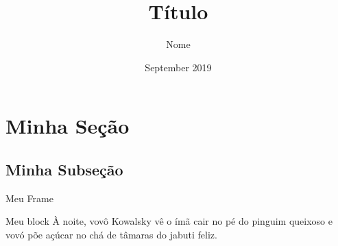 \documentclass{beamer}
\title{Título}
\author{Nome}
\date{September 2019}
\begin{document}
^^I^^I
\maketitle
^^I^^I
\section{Minha Seção}
^^I^^I
\subsection{Minha Subseção}
^^I^^I
\begin{frame}{Meu Frame}

    \begin{block}{Meu block}
        À noite, vovô Kowalsky vê o ímã cair no pé do pinguim queixoso e vovó põe açúcar no chá de tâmaras do jabuti feliz.
    \end{block}

\end{frame}
^^I
\end{document}
